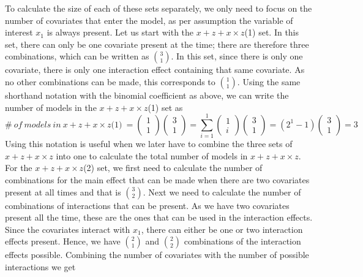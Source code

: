 To calculate the size of each of these sets separately, we only need to focus on the number of covariates that enter the model, as per assumption the variable of interest $x_1$ is always present. Let us start with the $x + z + x \times z$(1) set. In this set, there can only be one covariate present at the time; there are therefore three combinations, which can be written as $\binom{3}{1}$. In this set, since there is only one covariate, there is only one interaction effect containing that same covariate. As no other combinations can be made, this corresponds to $\binom{1}{1}$. Using the same shorthand notation with the binomial coefficient as above, we can write the number of models in the $x + z + x \times z$(1) set as
\[\#\ of\ models\ in\ x + z + x \times z\textit{(1)}\ =\left( \begin{array}{c}
1 \\ 
1 \end{array}
\right)\left( \begin{array}{c}
3 \\ 
1 \end{array}
\right)=\sum^1_{i=1}{\left( \begin{array}{c}
1 \\ 
i \end{array}
\right)}\left( \begin{array}{c}
3 \\ 
1 \end{array}
\right)=\left(2^1-1\right)\left( \begin{array}{c}
3 \\ 
1 \end{array}
\right)=3\] 
Using this notation is useful when we later have to combine the three sets of $x + z + x \times z$ into one to calculate the total number of models in $x + z + x \times z$.
\raggedbottom
For the $x + z + x \times z$(2) set, we first need to calculate the number of combinations for the main effect that can be made when there are two covariates present at all times and that is $\binom{3}{2}$. Next we need to calculate the number of combinations of interactions that can be present. As we have two covariates present all the time, these are the ones that can be used in the interaction effects. Since the covariates interact with $x_1$, there can either be one or two interaction effects present. Hence, we have $\binom{2}{1}$ and $\binom{2}{2}$ combinations of the interaction effects possible. Combining the number of covariates with the number of possible interactions we get
\raggedbottom
